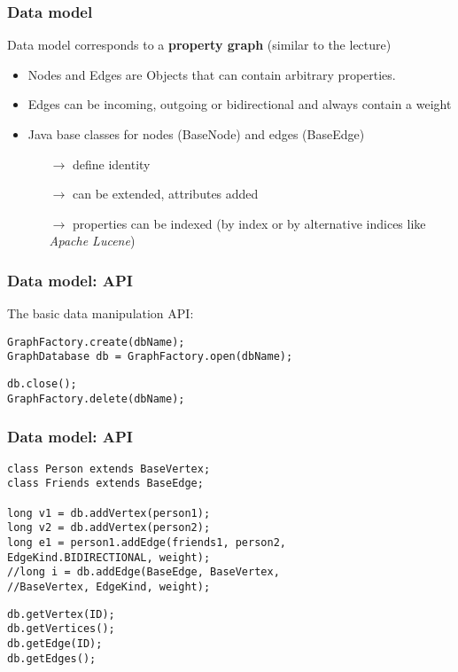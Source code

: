 
\begin{frame}
\frametitle{Data model}

Data model corresponds to a \textbf{property graph} (similar to the lecture) \pause
\begin{itemize}
	\item Nodes and Edges are Objects that can contain arbitrary properties. \pause
	\item Edges can be incoming, outgoing or bidirectional and always contain a weight \pause
	\item Java base classes for nodes (BaseNode) and edges (BaseEdge)
	\begin{itemize}
		\item[$\rightarrow$] define identity
		\item[$\rightarrow$] can be extended, attributes added
		\item[$\rightarrow$] properties can be indexed (by  index
		or by alternative indices like \textit{Apache Lucene})
	\end{itemize}
\end{itemize}

\end{frame}

\begin{frame}[fragile]
\frametitle{Data model: API}

The basic data manipulation API:

\pause

\begin{lstlisting}[caption=(Creating / opening a DB)]
GraphFactory.create(dbName);
GraphDatabase db = GraphFactory.open(dbName);
\end{lstlisting}

\pause

\begin{lstlisting}[caption=(Closing / deleting a DB)]
db.close();
GraphFactory.delete(dbName);
\end{lstlisting}

\end{frame}

\begin{frame}[fragile]
\frametitle{Data model: API}

\begin{lstlisting}[caption=(Vertex / Edge creation)]
class Person extends BaseVertex;
class Friends extends BaseEdge;

long v1 = db.addVertex(person1);
long v2 = db.addVertex(person2);
long e1 = person1.addEdge(friends1, person2,
EdgeKind.BIDIRECTIONAL, weight);
//long i = db.addEdge(BaseEdge, BaseVertex,
//BaseVertex, EdgeKind, weight);
\end{lstlisting}

\pause

\begin{lstlisting}[caption=(Vertex / Edge retrieval)]
db.getVertex(ID);
db.getVertices();
db.getEdge(ID);
db.getEdges();
\end{lstlisting}

\end{frame}

